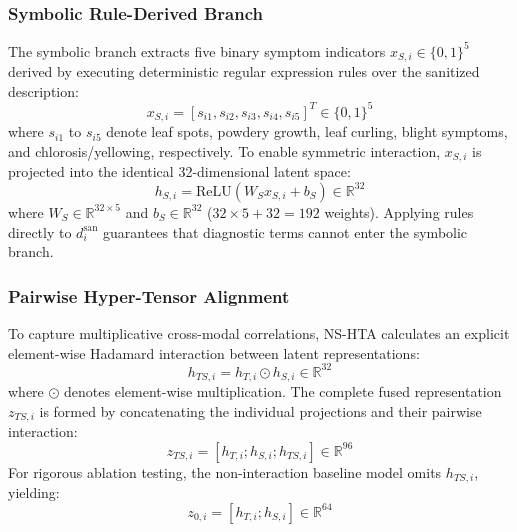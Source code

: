 \documentclass[conference]{IEEEtran}
\begin{document}
\subsubsection{Symbolic Rule-Derived Branch}
The symbolic branch extracts five binary symptom indicators $x_{S,i} \in \{0, 1\}^5$ derived by executing deterministic regular expression rules over the sanitized description:
\begin{equation}
x_{S,i} = [s_{i1}, s_{i2}, s_{i3}, s_{i4}, s_{i5}]^T \in \{0, 1\}^5
\label{eq:symbolic_vector}
\end{equation}
where $s_{i1}$ to $s_{i5}$ denote leaf spots, powdery growth, leaf curling, blight symptoms, and chlorosis/yellowing, respectively. To enable symmetric interaction, $x_{S,i}$ is projected into the identical 32-dimensional latent space:
\begin{equation}
h_{S,i} = \text{ReLU}(W_S x_{S,i} + b_S) \in \mathbb{R}^{32}
\label{eq:proj_sym}
\end{equation}
where $W_S \in \mathbb{R}^{32 \times 5}$ and $b_S \in \mathbb{R}^{32}$ ($32 \times 5 + 32 = 192$ weights). Applying rules directly to $d_i^{\text{san}}$ guarantees that diagnostic terms cannot enter the symbolic branch.

\subsubsection{Pairwise Hyper-Tensor Alignment}
To capture multiplicative cross-modal correlations, NS-HTA calculates an explicit element-wise Hadamard interaction between latent representations:
\begin{equation}
h_{TS,i} = h_{T,i} \odot h_{S,i} \in \mathbb{R}^{32}
\label{eq:hadamard}
\end{equation}
where $\odot$ denotes element-wise multiplication. The complete fused representation $z_{TS,i}$ is formed by concatenating the individual projections and their pairwise interaction:
\begin{equation}
z_{TS,i} = [h_{T,i}; h_{S,i}; h_{TS,i}] \in \mathbb{R}^{96}
\label{eq:fused_vector}
\end{equation}
For rigorous ablation testing, the non-interaction baseline model omits $h_{TS,i}$, yielding:
\begin{equation}
z_{0,i} = [h_{T,i}; h_{S,i}] \in \mathbb{R}^{64}
\label{eq:ablation_vector}
\end{equation}
\end{document}
